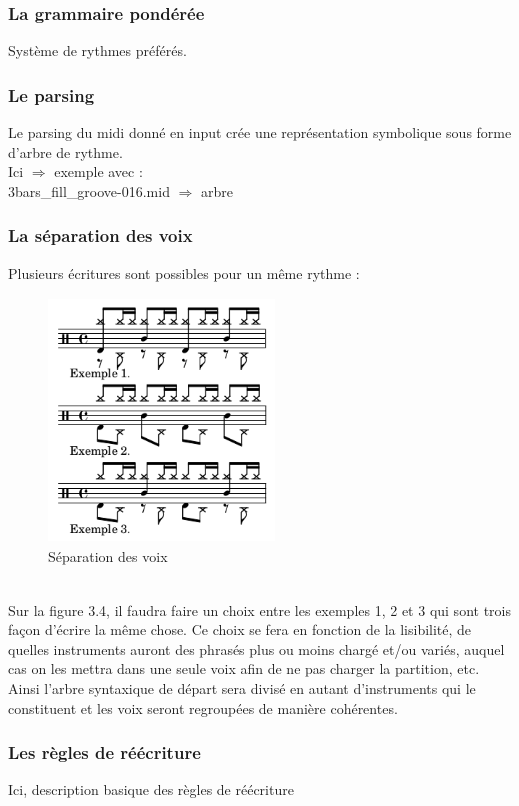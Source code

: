 \subsubsection{La grammaire pondérée}
Système de rythmes préférés.
\subsubsection{Le parsing}
Le parsing du midi donné en input crée une représentation symbolique sous forme d’arbre de rythme.\\
Ici $\Rightarrow$ exemple avec :\\
3bars\_fill\_groove-016.mid $\Rightarrow$ arbre\\
\subsubsection{La séparation des voix}
Plusieurs écritures sont possibles pour un même rythme :
\begin{figure}[h]
	\includegraphics[height=65mm, width=60mm]{z_images/1_description_notation/separation/0_exemples_separation.png}
	\caption{Séparation des voix}
\end{figure}\\
Sur la figure 3.4, il faudra faire un choix entre les exemples 1, 2 et 3 qui sont trois façon d’écrire la même chose. Ce choix se fera en fonction de la lisibilité, de quelles instruments auront des phrasés plus ou moins chargé et/ou variés, auquel cas on les mettra dans une seule voix afin de ne pas charger la partition, etc.
Ainsi l’arbre syntaxique de départ sera divisé en autant d’instruments qui le constituent et les voix seront regroupées de manière cohérentes.
\subsubsection{Les règles de réécriture}
Ici, description basique des règles de réécriture 
